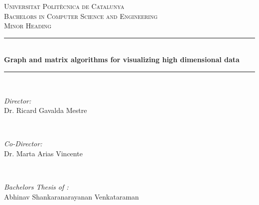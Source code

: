\begin{titlepage}

\newcommand{\HRule}{\rule{\linewidth}{0.5mm}} %

\center %
 

\textsc{\LARGE Universitat Politècnica de Catalunya}\\[2.5cm] %
\textsc{\Large Bachelors in Computer Science and Engineering}\\[0.5cm] %
\textsc{\large Minor Heading}\\[0.5cm] %


\HRule \\[0.4cm]
{ \huge \bfseries Graph and matrix algorithms for visualizing high dimensional data}\\[0.4cm] %
\HRule \\[1.5cm]
 

\begin{minipage}{0.4\textwidth}
\begin{flushleft} \large
\emph{Director:}\\
Dr. Ricard Gavalda Mestre 
\end{flushleft}
\end{minipage}
~
\begin{minipage}{0.4\textwidth}
\begin{flushright} \large
\emph{Co-Director:} \\
Dr. Marta Arias Vincente %
\end{flushright}
\end{minipage}\\[2cm]

\begin{minipage}{0.4\textwidth}
\begin{flushleft} \large
\emph{Bachelors Thesis of :}\\
Abhinav Shankaranarayanan Venkataraman
\end{flushleft}
\end{minipage}


\end{titlepage}
